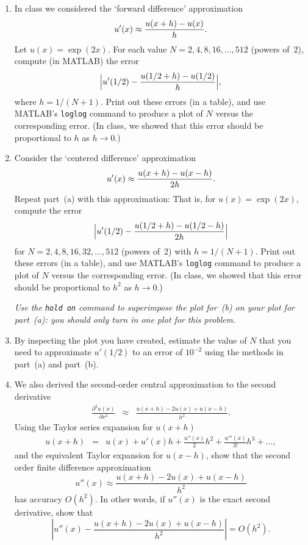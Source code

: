 \begin{enumerate}
\item In class we considered the `forward difference' approximation
      \[ u'(x) \approx {u(x+h) - u(x) \over h}.\]
      Let $u(x) = \exp(2x)$.  For each value 
      $N = 2, 4, 8, 16, \ldots, 512$ (powers of~2), compute (in MATLAB) the error
         \[ \Big| u'(1/2) -  {u(1/2+h) - u(1/2) \over h}\Big|,\]
      where $h = 1/(N+1)$.
      Print out these errors (in a table), and use MATLAB's \verb|loglog| command to 
      produce a plot of $N$ versus the corresponding error.
      (In class, we showed that this error should be proportional to $h$
       as $h\to 0$.)
      
\vspace*{1em} 
\item Consider the `centered difference' approximation
      \[ u'(x) \approx {u(x+h) - u(x-h) \over 2 h}.\]
      Repeat part~(a) with this approximation:
      That is, for $u(x) = \exp(2x)$, compute the error
         \[ \Big| u'(1/2) -  {u(1/2+h) - u(1/2-h) \over 2h}\Big|\]
      for $N = 2, 4, 8, 16, 32, \ldots, 512$ (powers of~2) with $h=1/(N+1)$.  
      Print out these errors (in a table), and use MATLAB's \verb|loglog| command to 
      produce a plot of $N$ versus the corresponding error.
      (In class, we showed that this error should be proportional to $h^2$
       as $h\to 0$.)

      \emph{Use the {\tt hold on} command to superimpose the plot for~(b)
      on your plot for part~(a):  you should only turn in one plot for
      this problem.}      

\item By inspecting the plot you have created, estimate the value of $N$ that you
      need to approximate $u'(1/2)$ to an error of $10^{-2}$ using the methods
      in part~(a) and part~(b).
      
\item  We also derived the second-order central approximation to the second derivative 
\begin{eqnarray*}
\frac{\partial^2 u(x)}{\partial x^2} %
&\approx & \frac{u(x+h)-2u(x) + u(x-h)}{h^2}.
\end{eqnarray*} 
Using the Taylor series expansion for $u(x+h)$ 
\begin{eqnarray*}
u(x+h) &=& u(x) + u'(x)h + \frac{u''(x)}{2}h^2 + \frac{u'''(x)}{3!}h^3 + \ldots,
\end{eqnarray*}
and the equivalent Taylor expansion for $u(x-h)$, show that the second order finite difference approximation
\[
u''(x) \approx \frac{u(x+h)-2u(x) + u(x-h)}{h^2}
\]
has accuracy $O(h^2)$.  In other words, if $u''(x)$ is the exact second derivative, show that 
\[
\left| u''(x) - \frac{u(x+h)-2u(x) + u(x-h)}{h^2}\right| = O(h^2).
\]

\end{enumerate}

